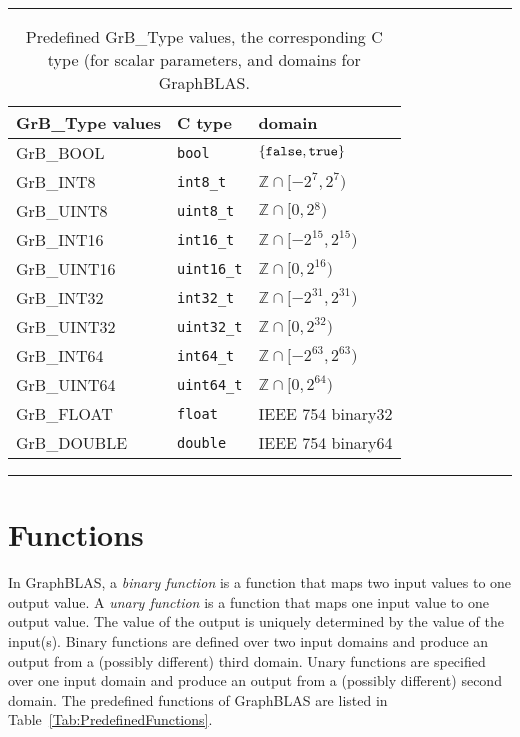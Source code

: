 \begin{table}
\hrule
\begin{center}
\caption{Predefined {\sf GrB\_Type} values, the corresponding C type (for scalar
parameters, and domains for GraphBLAS. 
        }
\label{Tab:PredefinedTypes}
\begin{tabular}{l|l|l}
{\sf GrB\_Type values} & C type            & domain \\
\hline
{\sf GrB\_BOOL}        & {\tt bool}        & $\{ {\tt false}, {\tt true} \}$  \\
{\sf GrB\_INT8}        & {\tt int8\_t}     & $\mathbb{Z} \cap [-2^{7},2^{7})$  \\
{\sf GrB\_UINT8}       & {\tt uint8\_t}    & $\mathbb{Z} \cap [0,2{^8})$  \\
{\sf GrB\_INT16}       & {\tt int16\_t}    & $\mathbb{Z} \cap [-2^{15},2^{15})$ \\
{\sf GrB\_UINT16}      & {\tt uint16\_t}   & $\mathbb{Z} \cap [0,2^{16})$ \\
{\sf GrB\_INT32}       & {\tt int32\_t}    & $\mathbb{Z} \cap [-2^{31},2^{31})$ \\
{\sf GrB\_UINT32}      & {\tt uint32\_t}   & $\mathbb{Z} \cap [0,2^{32})$ \\
{\sf GrB\_INT64}       & {\tt int64\_t}    & $\mathbb{Z} \cap [-2^{63},2^{63})$ \\
{\sf GrB\_UINT64}      & {\tt uint64\_t}   & $\mathbb{Z} \cap [0,2^{64})$ \\
{\sf GrB\_FLOAT}       & {\tt float}       & IEEE 754 {\sf binary32}  \\
{\sf GrB\_DOUBLE}      & {\tt double}      & IEEE 754 {\sf binary64}  \\
\end{tabular}
\end{center}
\hrule
\end{table}

\section{Functions}

In GraphBLAS, a \emph{binary function} is a function that maps two input
values to one output value. A \emph{unary function} is a function that 
maps one input value to one output value. The value of the output is uniquely
determined by the value of the input(s).  Binary functions are defined over 
two input domains and produce an output from a (possibly different) third 
domain. Unary functions are specified over one input domain and produce an 
output from a (possibly different) second domain.  The predefined functions 
of GraphBLAS are listed in Table~\ref{Tab:PredefinedFunctions}.

